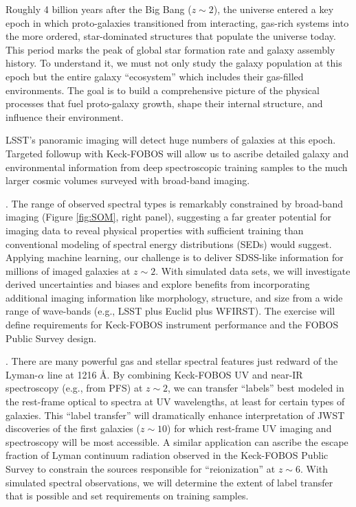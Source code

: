 \documentclass[oneside,11pt]{amsart}
\newcounter{chalno}
\newcommand{\chal}[1]{\refstepcounter{chalno}\label{#1}}
\begin{document}
Roughly 4 billion years after the Big Bang ($z \sim 2$), the universe entered a key epoch in which proto-galaxies
transitioned from interacting, gas-rich systems into the more ordered, star-dominated structures that populate the
universe today.  This period marks the peak of global star formation rate and galaxy assembly history.   To understand
it, we must not only study the galaxy population at this epoch but the entire galaxy ``ecosystem'' which includes their
gas-filled environments.  The goal is to build a comprehensive picture of the physical processes that fuel proto-galaxy
growth, shape their internal structure, and influence their environment.

LSST's panoramic imaging will detect huge numbers of galaxies at this epoch.  Targeted followup with Keck-FOBOS will
allow us to ascribe detailed galaxy and environmental information from deep spectroscopic training samples to the much
larger cosmic volumes surveyed with broad-band imaging.

\medskip
\chal{phot}
.  The range of observed spectral types is remarkably constrained by broad-band imaging (Figure \ref{fig:SOM}, right panel), suggesting a far greater potential for imaging data to reveal physical properties with sufficient training than conventional modeling of spectral energy distributions (SEDs) would suggest.  Applying machine learning, our challenge is to deliver SDSS-like information for millions of imaged galaxies at $z \sim 2$.  With simulated data sets, we will investigate derived uncertainties and biases and explore benefits from incorporating additional imaging information like morphology, structure, and size from a wide range of wave-bands (e.g., LSST plus Euclid plus WFIRST).  The exercise will define requirements for Keck-FOBOS instrument performance and the FOBOS Public Survey design.

\medskip
\chal{uv}
.  There are many powerful gas and stellar spectral features just redward of the Lyman-$\alpha$ line at 1216
\AA.  By combining Keck-FOBOS UV and near-IR spectroscopy (e.g., from PFS) at $z \sim 2$, we can transfer ``labels''
best modeled in the rest-frame optical to spectra at UV wavelengths, at least for certain types of galaxies.  This
``label transfer'' will dramatically enhance interpretation of JWST discoveries of the first galaxies ($z \sim 10$) for
which rest-frame UV imaging and spectroscopy will be most accessible.  A similar application can ascribe the escape
fraction of Lyman continuum radiation observed in the Keck-FOBOS Public Survey to constrain the sources responsible for
``reionization'' at $z \sim 6$.  With simulated spectral observations, we will determine the extent of label transfer
that is possible and set requirements on training samples.
\end{document}
